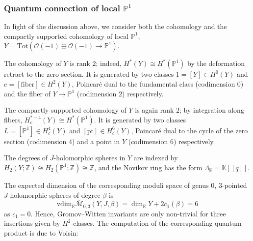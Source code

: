 \documentclass[reqno]{amsart}
\numberwithin{equation}{section}
\numberwithin{equation}{section}
\numberwithin{equation}{section}
\theoremstyle{definition}
\theoremstyle{remark}
\theoremstyle{remark}
\begin{document}
\subsubsection{Quantum connection of local $\mathbb{P}^1$}\label{ssec:qconn-localP1}
In light of the discussion above, we consider both the cohomology and the compactly supported cohomology of local $\mathbb{P}^1$, $Y = \mathrm{Tot} \left( \mathcal{O}(-1) \oplus \mathcal{O}(-1) \to \mathbb{P}^1 \right).$

The cohomology of $Y$ is rank $2$; indeed, $H^*(Y) \cong H^*(\mathbb{P}^1)$ by the deformation retract to the zero section. It is generated by two classes $1 =[Y]\in H^0(Y)$ and $e = [\mathrm{fiber}] \in H^2(Y)$, Poincar\'e dual to the fundamental class (codimension $0$) and the fiber of $Y \to \mathbb{P}^1$ (codimension $2$) respectively.

The compactly supported cohomology of $Y$ is again rank $2$; by integration along fibers, $H^{*-4}_c(Y) \cong H^*(\mathbb{P}^1)$. It is generated by two classes $L = [\mathbb{P}^1] \in H^4_c(Y)$ and $[\mathrm{pt}] \in H^6_c(Y)$, Poincar\'e dual to the cycle of the zero section (codimension $4$) and a point in $Y$ (codimension $6$) respectively.

The degrees of $J$-holomorphic spheres in $Y$ are indexed by $H_2(Y;\mathbb{Z}) \cong H_2(\mathbb{P}^1;\mathbb{Z}) \cong \mathbb{Z}$, and the Novikov ring has the form    $\Lambda_{\mathbb{K}} = \mathbb{K}[\![q]\!].$

The expected dimension of the corresponding moduli space of genus $0$, $3$-pointed $J$-holomorphic spheres of  degree $\beta$ is
\begin{equation}
    \mathrm{vdim}_{\mathbb{R}} \overline{\mathcal{M}}_{0, 3} (Y,J,\beta) = \dim_{\mathbb{R}} Y + 2 c_1(\beta) = 6
\end{equation}
as $c_1  = 0$. Hence, Gromov--Witten invariants are only non-trivial for three insertions given by $H^2$-classes. The computation of the corresponding quantum product is due to Voisin:
\end{document}
